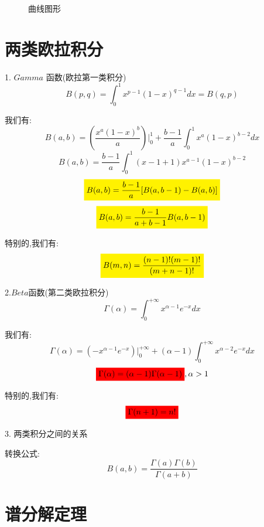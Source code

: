 \begin{figure}[H]
	\caption{曲线图形}
\end{figure}

\section{两类欧拉积分}

\begin{definition}	
	1. $Gamma$ 函数(欧拉第一类积分)
	$$B(p,q)=\int_{0}^{1}x^{p-1}(1-x)^{q-1}dx=B(q,p)$$
	
	我们有:  $$B(a,b)=(\frac{x^a(1-x)^b}{a})|_{0}^{1}+\frac{b-1}{a}\int_{0}^{1}x^{a}(1-x)^{b-2}dx$$
	$$B(a,b)=\frac{b-1}{a}\int_{0}^{1}(x-1+1)x^{a-1}(1-x)^{b-2}$$
	$$\mathcolorbox{yellow}{B(a,b)=\frac{b-1}{a}[B(a,b-1)-B(a,b)]}$$ $$\mathcolorbox{yellow}{B(a,b)=\frac{b-1}{a+b-1}B(a,b-1)}$$
	
	特别的,我们有:  $$\mathcolorbox{yellow}{B(m,n)=\frac{(n-1)!(m-1)!}{(m+n-1)!}}$$
	
	2.$Beta$函数(第二类欧拉积分)
	$$\Gamma(\alpha)=\int_{0}^{+\infty}x^{\alpha-1}e^{-x}dx$$
	
	我们有:  $$\Gamma(\alpha)=(-x^{\alpha-1}e^{-x})|_{0}^{+\infty}+(\alpha-1)\int_{0}^{+\infty}x^{\alpha-2}e^{-x}dx$$
	$$\mathcolorbox{red}{\Gamma(\alpha)=(\alpha-1)\Gamma(\alpha-1)},\alpha>1$$
	
	特别的,我们有:  $$\mathcolorbox{red}{\Gamma(n+1)=n!}$$
	
	3. 两类积分之间的关系
	
	转换公式:  
	$$B(a,b)=\frac{\Gamma(a)\Gamma(b)}{\Gamma(a+b)}$$
	
\end{definition}


\section{谱分解定理}

